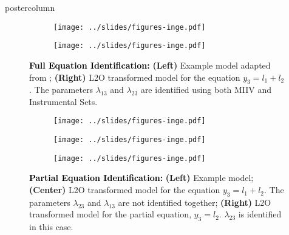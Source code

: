 \documentclass{beamer}
\begin{document}
\begin{frame}
\begin{columns}
\begin{column}{.33\textwidth}
\begin{beamercolorbox}[center]{postercolumn}
\begin{minipage}{.98\textwidth}
{\begin{myblock}{}
\begin{enumerate}
						\end{enumerate}
					\end{myblock}\vfill
					\begin{myblock}{}
						\begin{figure}
							\begin{subfigure}{0.5 \linewidth}
								\centering
								\texttt{[image: ../slides/figures-inge.pdf]}
							\end{subfigure}%
							\begin{subfigure}{0.5 \linewidth}
								\centering
								\texttt{[image: ../slides/figures-inge.pdf]}
							\end{subfigure}
							\caption*{\textbf{\textcolor{black}{Full Equation Identification:}} \textbf{(Left)} Example model adapted from \citet{Shen2001}; 
										\textbf{(Right)} L2O transformed model for the equation $ y_3 = l_1 + l_2 $. The parameters 
										$ \lambda_{13} $ and $ \lambda_{23} $ are identified using both MIIV and Instrumental Sets.}
						\end{figure}
						\vspace{0.6em}
						\begin{figure}
							\begin{subfigure}{0.33 \linewidth}
								\centering
								\texttt{[image: ../slides/figures-inge.pdf]}
							\end{subfigure}%
							\begin{subfigure}{0.33 \linewidth}
								\centering
								\texttt{[image: ../slides/figures-inge.pdf]}
							\end{subfigure}%
							\begin{subfigure}{0.33 \linewidth}
								\centering
								\texttt{[image: ../slides/figures-inge.pdf]}
							\end{subfigure}
							\caption*{\textbf{\textcolor{black}{Partial Equation Identification:}} \textbf{(Left)} Example model; 
										\textbf{(Center)} L2O transformed model for the equation $ y_3 = l_1 + l_2 $. The parameters 
										$ \lambda_{23} $ and $ \lambda_{13} $ are not identified together; \textbf{(Right)} L2O 
										transformed model for the partial equation, $ y_3 = l_2 $. $ \lambda_{23} $ is identified in this case.
										}
						\end{figure}
						\vspace{0.6em}
						\begin{figure}

\end{figure}
\end{myblock}}
\end{minipage}
\end{beamercolorbox}
\end{column}
\end{columns}
\end{frame}
\end{document}
